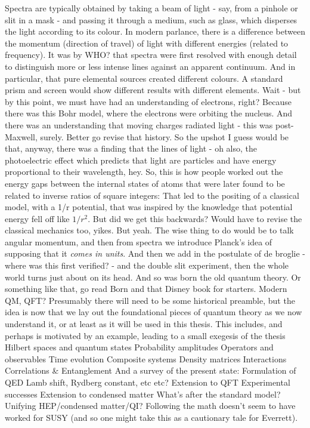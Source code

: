Spectra are typically obtained by taking a beam of light - say, from a
pinhole or slit in a mask - and passing it through a medium, such as
glass, which disperses the light according to its colour.
	In modern
parlance, there is a difference between the momentum (direction of
travel) of light with different energies (related to frequency).
	It was
by WHO? that spectra were first resolved with enough detail to
distinguish more or less intense lines against an apparent continuum.
And in particular, that pure elemental sources created different
colours.
	A standard prism and screen would show different results with
different elements.
	Wait - but by this point, we must have had an
understanding of electrons, right? Because there was this Bohr model,
where the electrons were orbiting the nucleus.
	And there was an
understanding that moving charges radiated light - this was
post-Maxwell, surely.
	Better go revise that history.
	So the upshot I
guess would be that, anyway, there was a finding that the lines of light
- oh also, the photoelectric effect which predicts that light are
particles and have energy proportional to their wavelength, hey.
	So,
this is how people worked out the energy gaps between the internal
states of atoms that were later found to be related to inverse ratios of
square integers: That led to the positing of a classical model, with a
1/r potential, that was inspired by the knowledge that potential energy
fell off like $1/r^2$.
	But did we get this backwards? Would have to
revise the classical mechanics too, yikes.
	But yeah.
	The wise thing to
do would be to talk angular momentum, and then from spectra we introduce
Planck's idea of supposing that it \emph{comes in units}.
	And then we
add in the postulate of de broglie - where was this first verified? -
and the double slit experiment, then the whole world turns just about on
its head.
	And so was born the old quantum theory.
	Or something like
that, go read Born and that Disney book for starters.
	Modern QM, QFT?
Presumably there will need to be some historical preamble, but the idea
is now that we lay out the foundational pieces of quantum theory as we
now understand it, or at least as it will be used in this thesis.
	This
includes, and perhaps is motivated by an example, leading to a small
exegesis of the thesis Hilbert spaces and quantum states Probability
amplitudes Operators and observables Time evolution Composite systems
Density matrices Interactions Correlations \& Entanglement And a survey
of the present state: Formulation of QED Lamb shift, Rydberg constant,
etc etc? Extension to QFT Experimental successes Extension to condensed
matter What's after the standard model? Unifying HEP/condensed
matter/QI? Following the math doesn't seem to have worked for SUSY (and
so one might take this as a cautionary tale for Everrett).

